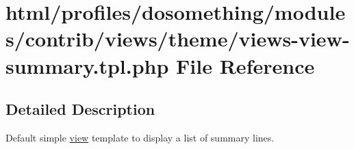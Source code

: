 \hypertarget{views-view-summary_8tpl_8php}{
\section{html/profiles/dosomething/modules/contrib/views/theme/views-\/view-\/summary.tpl.php File Reference}
\label{views-view-summary_8tpl_8php}
}


\subsection{Detailed Description}
Default simple \hyperlink{classview}{view} template to display a list of summary lines. 
